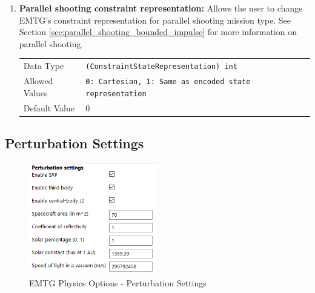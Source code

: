 \begin{enumerate}
        \item \textbf{Parallel shooting constraint representation:}  Allows the user to change \ac{EMTG}'s constraint representation for parallel shooting mission type. See Section \ref{sec:parallel_shooting_bounded_impulse} for more information on parallel shooting.

            \begin{table}[H]
                \hspace{2cm}
                \begin{tabular}{lp{3cm}}
                Data Type & \verb|(ConstraintStateRepresentation) int| \\
                Allowed Values & \verb|0: Cartesian, 1: Same as encoded state representation| \\
                Default Value & 0 \\
                \end{tabular}
            \end{table}

    \end{enumerate}

\subsection{Perturbation Settings}

    \begin{figure}[H]
        \centering
        \includegraphics[width=0.5\textwidth]{../../shared_latex_inputs/images/pyemtg_physics-perturbation_options.png}
        \caption{EMTG Physics Options - Perturbation Settings}
    \end{figure}


